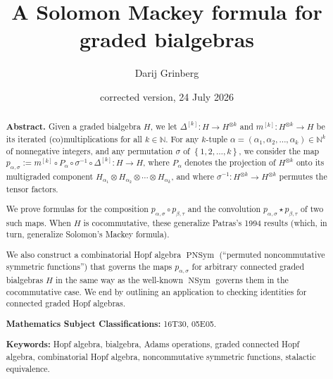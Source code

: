 \documentclass[numbers=enddot,12pt,final,onecolumn,notitlepage]{scrartcl}%
\theoremstyle{definition}
\begin{document}
\title{A Solomon Mackey formula for graded bialgebras}
\author{Darij Grinberg}
\date{corrected version,
24 July 2026}
\maketitle

\begin{abstract}
\textbf{Abstract.} Given a graded bialgebra $H$, we let $\Delta^{\left[
k\right]  }:H\rightarrow H^{\otimes k}$ and $m^{\left[  k\right]  }:H^{\otimes
k}\rightarrow H$ be its iterated (co)multiplications for all $k\in\mathbb{N}$.
For any $k$-tuple $\alpha=\left(  \alpha_{1},\alpha_{2},\ldots,\alpha
_{k}\right)  \in\mathbb{N}^{k}$ of nonnegative integers, and any permutation
$\sigma$ of $\left\{  1,2,\ldots,k\right\}  $, we consider the map
$p_{\alpha,\sigma}:=m^{\left[  k\right]  }\circ P_{\alpha}\circ\sigma
^{-1}\circ\Delta^{\left[  k\right]  }:H\rightarrow H$, where $P_{\alpha}$
denotes the projection of $H^{\otimes k}$ onto its multigraded component
$H_{\alpha_{1}}\otimes H_{\alpha_{2}}\otimes\cdots\otimes H_{\alpha_{k}}$, and
where $\sigma^{-1}:H^{\otimes k}\rightarrow H^{\otimes k}$ permutes the tensor factors.

We prove formulas for the composition $p_{\alpha,\sigma}\circ p_{\beta,\tau}$
and the convolution $p_{\alpha,\sigma}\star p_{\beta,\tau}$ of two such maps.
When $H$ is cocommutative, these generalize Patras's 1994 results (which, in
turn, generalize Solomon's Mackey formula).

We also construct a combinatorial Hopf algebra $\operatorname*{PNSym}$
(\textquotedblleft permuted noncommutative symmetric
functions\textquotedblright) that governs the maps $p_{\alpha,\sigma}$ for
arbitrary connected graded bialgebras $H$ in the same way as the well-known
$\operatorname*{NSym}$ governs them in the cocommutative case. We end by
outlining an application to checking identities for connected graded Hopf
algebras. \medskip

\textbf{Mathematics Subject Classifications:} 16T30, 05E05. \medskip

\textbf{Keywords:} Hopf algebra, bialgebra, Adams operations, graded connected
Hopf algebra, combinatorial Hopf algebra, noncommutative symmetric functions,
stalactic equivalence.

\end{abstract}
\end{document}
